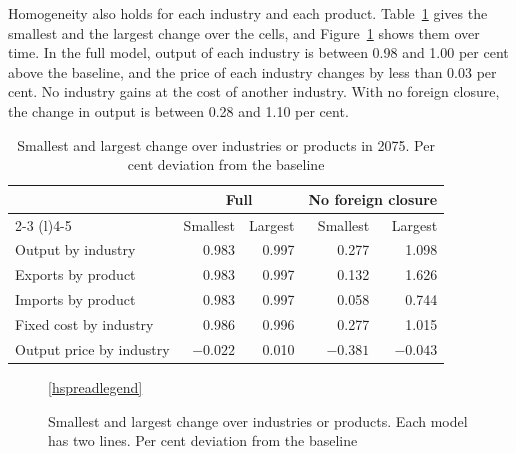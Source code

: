 \documentclass[11pt,a4paper]{article}
\begin{document}
Homogeneity also holds for each industry and each product. Table~\ref{tab:spread} gives the smallest and the largest change over the cells, and Figure~\ref{fig:spread} shows them over time.
In the full model, output of each industry is between 0.98 and 1.00 per cent above the baseline, and the price of each industry changes by less than 0.03 per cent. No industry gains at the cost of another industry.
With no foreign closure, the change in output is between 0.28 and 1.10 per cent.

\begin{table}[H]
\centering
\small
\caption{Smallest and largest change over industries or products in 2075. Per cent deviation from the baseline}
\label{tab:spread}
\begin{tabular}{@{}lrrrr@{}}
\toprule
 & \multicolumn{2}{c}{Full} & \multicolumn{2}{c}{No foreign closure} \\
\cmidrule(lr){2-3} \cmidrule(l){4-5}
 & Smallest & Largest & Smallest & Largest \\
\midrule
Output by industry & 0.983 & 0.997 & 0.277 & 1.098 \\
Exports by product & 0.983 & 0.997 & 0.132 & 1.626 \\
Imports by product & 0.983 & 0.997 & 0.058 & 0.744 \\
Fixed cost by industry & 0.986 & 0.996 & 0.277 & 1.015 \\
Output price by industry & $-0.022$ & 0.010 & $-0.381$ & $-0.043$ \\
\bottomrule
\end{tabular}
\end{table}

\begin{figure}[H]
\centering
{}

\ref{hspreadlegend}
\caption{Smallest and largest change over industries or products. Each model has two lines. Per cent deviation from the baseline}
\label{fig:spread}
\end{figure}
\end{document}
